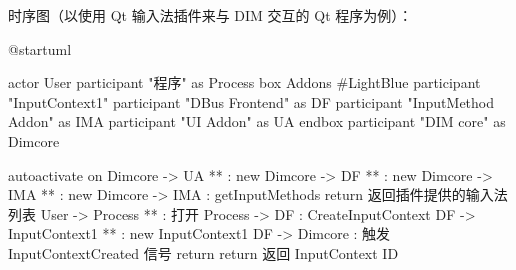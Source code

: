 \documentclass{utart}
\begin{document}
        \pagebreak
        \par 时序图（以使用 Qt 输入法插件来与 DIM 交互的 Qt 程序为例）：

        \begin{plantuml}
        @startuml

        actor User
        participant "程序" as Process
        box Addons #LightBlue
        participant "InputContext1"
        participant "DBus Frontend" as DF
        participant "InputMethod Addon" as IMA
        participant "UI Addon" as UA
        endbox
        participant "DIM core" as Dimcore

        autoactivate on
        Dimcore -> UA ** : new
        Dimcore -> DF ** : new
        Dimcore -> IMA ** : new
        Dimcore -> IMA : getInputMethods
        return 返回插件提供的输入法列表
        User -> Process ** : 打开
        Process -> DF : CreateInputContext
        DF -> InputContext1 ** : new InputContext1
        DF -> Dimcore : 触发 InputContextCreated 信号
        return
        return 返回 InputContext ID


\end{plantuml}
\end{document}
